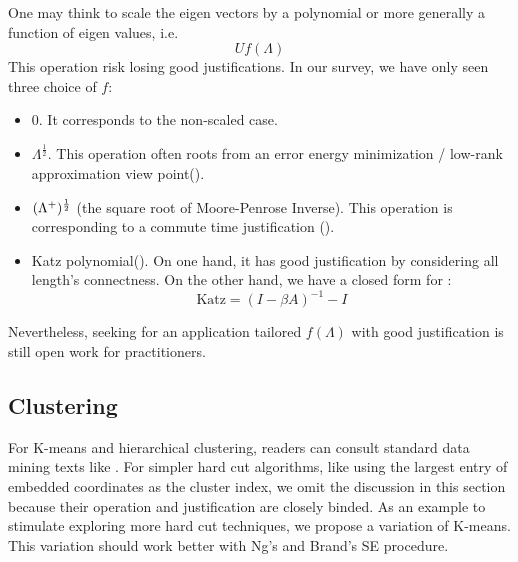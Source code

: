 One may think to scale the eigen vectors by a polynomial or 
more generally a function of eigen values, i.e.
\begin{equation}
	U f(\Lambda)
	\label{eq:post_scale_f}
\end{equation}
This operation risk losing good justifications. In our survey, 
we have only seen three choice of $ f $:
\begin{itemize}
	\item 0. It corresponds to the non-scaled case. 
	\item $ \Lambda^{\frac{1}{2}} $. This operation often roots 
	from an error energy minimization / low-rank approximation
	view point(\rsec{\ref{sec:lrapprox}}).
	\item $ (\Lambda^{+})^{\frac{1}{2}} $
	(the square root of Moore-Penrose Inverse\cite{wiki_mpinv}). 
	This operation is corresponding to a commute time justification
	(\rsec{\ref{sec:commute}}). 
	\item Katz polynomial(\req{\ref{eq:katz}}). On one hand, 
	it has good justification by considering all length's 
	connectness. On the other hand, we have a closed form for 
	\req{\ref{eq:katz}}:\cite{aggarwal2011social}
		\begin{equation}
			\text{Katz} = (I - \beta A)^{-1} - I
		\end{equation}
\end{itemize}
Nevertheless, seeking for an application tailored $ f(\Lambda) $
with good justification is still open work for practitioners. 

\subsection{Clustering}

For K-means and hierarchical clustering, readers
can consult standard data mining texts like \cite{jiawei2001data}.
For simpler hard cut algorithms, like using the 
largest entry of embedded coordinates as the cluster index, 
we omit the discussion in this section because their operation 
and justification are closely binded. As an example 
to stimulate exploring more hard cut techniques, we propose 
a variation of K-means. This variation should work better with 
Ng's \cite{ng2002spectral} and Brand's \cite{brand2003unifying} 
SE procedure. 


